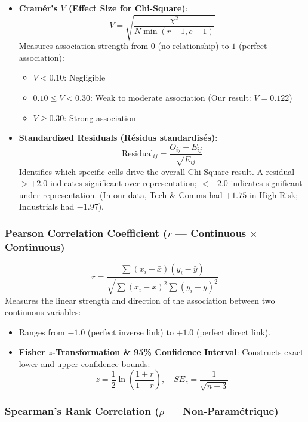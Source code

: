 \documentclass[
]{article}
\providecommand{\tightlist}{%
  \setlength{\itemsep}{0pt}\setlength{\parskip}{0pt}}
\begin{document}
\begin{itemize}
\tightlist
\item
  \textbf{Cramér's \(V\) (Effect Size for Chi-Square)}:
  \[V = \sqrt{\frac{\chi^2}{N \min(r - 1, c - 1)}}\] Measures
  association strength from \(0\) (no relationship) to \(1\) (perfect
  association):

  \begin{itemize}
  \tightlist
  \item
    \(V < 0.10\): Negligible
  \item
    \(0.10 \le V < 0.30\): Weak to moderate association (Our result:
    \(V = 0.122\))
  \item
    \(V \ge 0.30\): Strong association
  \end{itemize}
\item
  \textbf{Standardized Residuals (Résidus standardisés)}:
  \[\text{Residual}_{ij} = \frac{O_{ij} - E_{ij}}{\sqrt{E_{ij}}}\]
  Identifies which specific cells drive the overall Chi-Square result. A
  residual \(> +2.0\) indicates significant over-representation;
  \(< -2.0\) indicates significant under-representation. (In our data,
  Tech \& Comms had \(+1.75\) in High Risk; Industrials had \(-1.97\)).
\end{itemize}

\subsubsection{\texorpdfstring{Pearson Correlation Coefficient (\(r\)
--- Continuous \(\times\)
Continuous)}{Pearson Correlation Coefficient (r --- Continuous \textbackslash times Continuous)}}\label{pearson-correlation-coefficient-r-continuous-times-continuous}

\[r = \frac{\sum (x_i - \bar{x})(y_i - \bar{y})}{\sqrt{\sum (x_i - \bar{x})^2 \sum (y_i - \bar{y})^2}}\]
Measures the linear strength and direction of the association between
two continuous variables:

\begin{itemize}
\tightlist
\item
  Ranges from \(-1.0\) (perfect inverse link) to \(+1.0\) (perfect
  direct link).
\item
  \textbf{Fisher \(z\)-Transformation \& 95\% Confidence Interval}:
  Constructs exact lower and upper confidence bounds:
  \[z = \frac{1}{2} \ln \left(\frac{1+r}{1-r}\right), \quad SE_z = \frac{1}{\sqrt{n - 3}}\]
\end{itemize}

\subsubsection{\texorpdfstring{Spearman's Rank Correlation (\(\rho\) ---
Non-Paramétrique)}{Spearman's Rank Correlation (\textbackslash rho --- Non-Paramétrique)}}\label{spearmans-rank-correlation-rho-non-paramuxe9trique}
\end{document}
